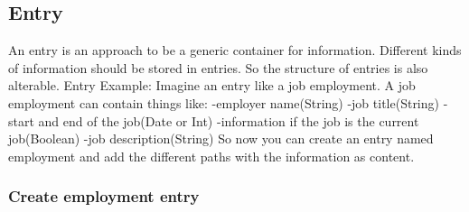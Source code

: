 \subsection{Entry}
An entry is an approach to be a generic container for information. Different kinds of information should be stored in entries. So the structure of entries is also alterable. 
Entry Example: Imagine an entry like a job employment. A job employment can contain things like:
 -employer name(String)
 -job title(String)
 -start and end of the job(Date or Int)
 -information if the job is the current job(Boolean)
 -job description(String)
So now you can create an entry named employment and add the different paths with the information as content.

\subsubsection{Create employment entry}
\begin{verbatim}

\end{verbatim}

















































